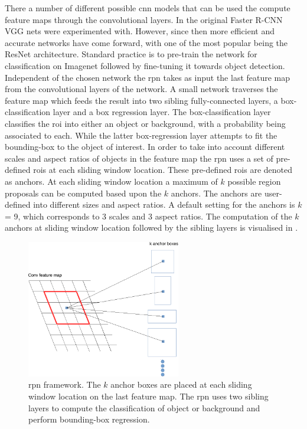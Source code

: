 There a number of different possible \gls{cnn} models that can be used the compute feature maps through the convolutional layers. In the original Faster R-CNN VGG nets \cite{vgg16} were experimented with. However, since then more efficient and accurate networks have come forward, with one of the most popular being the ResNet \cite{deepres} architecture. Standard practice is to pre-train the network for classification on Imagenet followed by fine-tuning it towards object detection. Independent of the chosen network the \gls{rpn} takes as input the last feature map from the convolutional layers of the network. A small network traverses the feature map which feeds the result into two sibling fully-connected layers, a box-classification layer and a box regression layer. The box-classification layer classifies the \gls{roi} into either an object or background, with a probability being associated to each. While the latter box-regression layer attempts to fit the bounding-box to the object of interest. In order to take into account different scales and aspect ratios of objects in the feature map the \gls{rpn} uses a set of pre-defined \glspl{roi} at each sliding window location. These pre-defined \glspl{roi} are denoted as anchors. At each sliding window location a maximum of $k$ possible region proposals can be computed based upon the $k$ anchors. The anchors are user-defined into different sizes and aspect ratios. A default setting for the anchors is $k$ = 9, which corresponds to 3 scales and 3 aspect ratios. The computation of the $k$ anchors at sliding window location followed by the sibling layers is visualised in .

\begin{figure}[H]
  \centering
    \includegraphics[width=0.6\textwidth]{Figs/Techanal/rpn1-crop.pdf}
      \caption{\gls{rpn} framework. The $k$ anchor boxes are placed at each sliding window location on the last feature map. The \gls{rpn} uses two sibling layers to compute the classification of object or background and perform bounding-box regression.}
    \label{fig:rpnframework}
\end{figure}


